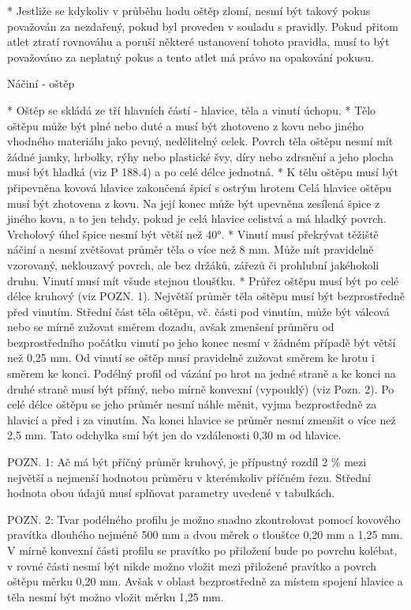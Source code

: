 * Jestliže se kdykoliv v průběhu hodu oštěp zlomí, nesmí být takový pokus považován za nezdařený, pokud byl proveden v souladu s pravidly. Pokud přitom atlet ztratí rovnováhu a poruší některé ustanovení tohoto pravidla, musí to být považováno za neplatný pokus a tento atlet má právo na opakování pokusu.

Náčiní - oštěp

* Oštěp se skládá ze tří hlavních částí  - hlavice, těla a vinutí úchopu.
* Tělo oštěpu může být plné nebo duté a musí být zhotoveno z kovu nebo jiného vhodného materiálu jako pevný, nedělitelný celek. Povrch těla oštěpu nesmí mít žádné jamky, hrbolky, rýhy nebo plastické švy, díry nebo zdrsnění a jeho plocha musí být hladká (viz P 188.4) a po celé délce jednotná.
* K tělu oštěpu musí být připevněna kovová hlavice zakončená špicí s ostrým hrotem Celá hlavice oštěpu musí být zhotovena z kovu. Na její konec může být upevněna zesílená špice z jiného kovu, a to jen tehdy, pokud je celá hlavice celistvá a má hladký povrch. Vrcholový úhel špice nesmí být větší než 40°.
* Vinutí musí překrývat těžiště náčiní a nesmí zvětšovat průměr těla o více než 8 mm. Může mít pravidelně vzorovaný, neklouzavý povrch, ale bez držáků, zářezů či prohlubní jakéhokoli druhu. Vinutí musí mít všude stejnou tloušťku.
* Průřez oštěpu musí být po celé délce kruhový (viz POZN. 1). Největší průměr těla oštěpu musí být bezprostředně před vinutím. Střední část těla oštěpu, vč. části pod vinutím, může být válcová nebo se mírně zužovat směrem dozadu, avšak zmenšení průměru od bezprostředního počátku vinutí po jeho konec nesmí v žádném případě být větší než 0,25 mm. Od vinutí se oštěp musí pravidelně zužovat směrem ke hrotu i směrem ke konci. Podélný profil od vázání po hrot na jedné straně a ke konci na druhé straně musí být přímý, nebo mírně konvexní (vypouklý) (viz Pozn. 2). Po celé délce oštěpu se jeho průměr nesmí náhle měnit, vyjma bezprostředně za hlavicí a před i za vinutím. Na konci hlavice se průměr nesmí zmenšit o více než 2,5 mm. Tato odchylka smí být jen do vzdálenosti 0,30 m od hlavice.

POZN. 1: Ač má být příčný průměr kruhový, je přípustný rozdíl 2 \% mezi největší a nejmenší hodnotou průměru v kterémkoliv příčném řezu. Střední hodnota obou údajů musí splňovat parametry uvedené v tabulkách.

POZN. 2: Tvar podélného profilu je možno snadno zkontrolovat pomocí kovového pravítka dlouhého nejméně 500 mm a dvou měrek o tloušťce 0,20 mm a 1,25 mm. V mírně konvexní části profilu se pravítko po přiložení bude po povrchu kolébat, v rovné části nesmí být nikde možno vložit mezi přiložené pravítko a povrch oštěpu měrku 0,20 mm. Avšak v oblast bezprostředně za místem spojení hlavice a těla nesmí být možno vložit měrku 1,25 mm.

